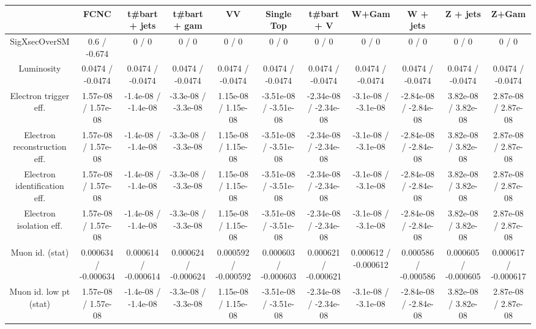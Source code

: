 \begin{table}[htbp]
\begin{center}
\footnotesize
\begin{tabular}{|c|c|c|c|c|c|c|c|c|c|c|}
\hline 
      & FCNC      & t#bar{t} + jets      & t#bar{t} +  gam      & VV      & Single Top      & t#bar{t} + V      & W+Gam      & W + jets      & Z + jets      & Z+Gam \\ 
\hline 
 SigXsecOverSM & 0.6 / -0.674 & 0 / 0 & 0 / 0 & 0 / 0 & 0 / 0 & 0 / 0 & 0 / 0 & 0 / 0 & 0 / 0 & 0 / 0 \\ 
  Luminosity & 0.0474 / -0.0474 & 0.0474 / -0.0474 & 0.0474 / -0.0474 & 0.0474 / -0.0474 & 0.0474 / -0.0474 & 0.0474 / -0.0474 & 0.0474 / -0.0474 & 0.0474 / -0.0474 & 0.0474 / -0.0474 & 0.0474 / -0.0474 \\ 
  Electron trigger eff. & 1.57e-08 / 1.57e-08 & -1.4e-08 / -1.4e-08 & -3.3e-08 / -3.3e-08 & 1.15e-08 / 1.15e-08 & -3.51e-08 / -3.51e-08 & -2.34e-08 / -2.34e-08 & -3.1e-08 / -3.1e-08 & -2.84e-08 / -2.84e-08 & 3.82e-08 / 3.82e-08 & 2.87e-08 / 2.87e-08 \\ 
  Electron reconstruction eff. & 1.57e-08 / 1.57e-08 & -1.4e-08 / -1.4e-08 & -3.3e-08 / -3.3e-08 & 1.15e-08 / 1.15e-08 & -3.51e-08 / -3.51e-08 & -2.34e-08 / -2.34e-08 & -3.1e-08 / -3.1e-08 & -2.84e-08 / -2.84e-08 & 3.82e-08 / 3.82e-08 & 2.87e-08 / 2.87e-08 \\ 
  Electron identification eff. & 1.57e-08 / 1.57e-08 & -1.4e-08 / -1.4e-08 & -3.3e-08 / -3.3e-08 & 1.15e-08 / 1.15e-08 & -3.51e-08 / -3.51e-08 & -2.34e-08 / -2.34e-08 & -3.1e-08 / -3.1e-08 & -2.84e-08 / -2.84e-08 & 3.82e-08 / 3.82e-08 & 2.87e-08 / 2.87e-08 \\ 
  Electron isolation eff. & 1.57e-08 / 1.57e-08 & -1.4e-08 / -1.4e-08 & -3.3e-08 / -3.3e-08 & 1.15e-08 / 1.15e-08 & -3.51e-08 / -3.51e-08 & -2.34e-08 / -2.34e-08 & -3.1e-08 / -3.1e-08 & -2.84e-08 / -2.84e-08 & 3.82e-08 / 3.82e-08 & 2.87e-08 / 2.87e-08 \\ 
  Muon id. (stat) & 0.000634 / -0.000634 & 0.000614 / -0.000614 & 0.000624 / -0.000624 & 0.000592 / -0.000592 & 0.000603 / -0.000603 & 0.000621 / -0.000621 & 0.000612 / -0.000612 & 0.000586 / -0.000586 & 0.000605 / -0.000605 & 0.000617 / -0.000617 \\ 
  Muon id. low pt (stat) & 1.57e-08 / 1.57e-08 & -1.4e-08 / -1.4e-08 & -3.3e-08 / -3.3e-08 & 1.15e-08 / 1.15e-08 & -3.51e-08 / -3.51e-08 & -2.34e-08 / -2.34e-08 & -3.1e-08 / -3.1e-08 & -2.84e-08 / -2.84e-08 & 3.82e-08 / 3.82e-08 & 2.87e-08 / 2.87e-08 \\ 

\end{tabular}
\end{center}
\end{table}
